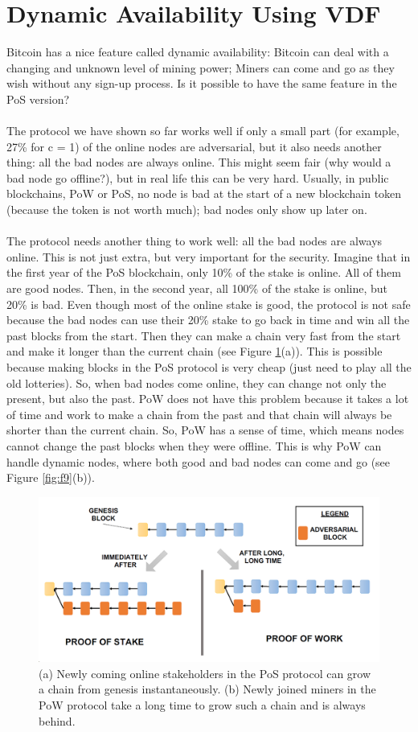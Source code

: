 \section{Dynamic Availability Using VDF}
Bitcoin has a nice feature called dynamic availability: Bitcoin can deal with a changing and unknown level of mining power; Miners can come and go as they wish without any sign-up process. Is it possible to have the same feature in the PoS version?\\\\
The protocol we have shown so far works well if only a small part (for example, 27\% for c = 1) of the online nodes are adversarial, but it also needs another thing: all the bad nodes are always online. This might seem fair (why would a bad node go offline?), but in real life this can be very hard. Usually, in public blockchains, PoW or PoS, no node is bad at the start of a new blockchain token (because the token is not worth much); bad nodes only show up later on.\\\\
The protocol needs another thing to work well: all the bad nodes are always online. This is not just extra, but very important for the security. Imagine that in the first year of the PoS blockchain, only 10\% of the stake is online. All of them are good nodes. Then, in the second year, all 100\% of the stake is online, but 20\% is bad. Even though most of the online stake is good, the protocol is not safe because the bad nodes can use their 20\% stake to go back in time and win all the past blocks from the start. Then they can make a chain very fast from the start and make it longer than the current chain (see Figure \ref{fig:l11_f9}(a)). This is possible because making blocks in the PoS protocol is very cheap (just need to play all the old lotteries). So, when bad nodes come online, they can change not only the present, but also the past. PoW does not have this problem because it takes a lot of time and work to make a chain from the past and that chain will always be shorter than the current chain. So, PoW has a sense of time, which means nodes cannot change the past blocks when they were offline. This is why PoW can handle dynamic nodes, where both good and bad nodes can come and go (see Figure \ref{fig:f9}(b)).
\begin{figure}[h!]
	\centering
	\includegraphics[width=0.7\linewidth]{Fig/L11_F9}
	\caption{(a) Newly coming online stakeholders in the PoS protocol can grow a chain from genesis
		instantaneously. (b) Newly joined miners in the PoW protocol take a long time to grow such a chain
		and is always behind.}
	\label{fig:l11_f9}
\end{figure}
